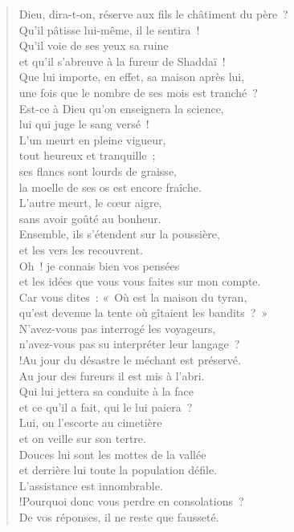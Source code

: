 \documentclass[french,twoside]{book} %
\def\mednobreak{\ifdim\lastskip<\medskipamount
  \removelastskip\nopagebreak\medskip\fi}
\newcommand{\labelblock}[1]{\medbreak{\noindent\color{rubric}\bfseries #1}\par\mednobreak}
\newcommand\chapterclose{} %
\begin{document}
\labelblock{Impunité des criminels}


\begin{verse}
Dieu, dira-t-on, réserve aux fils le châtiment du père ? \\
Qu’il pâtisse lui-même, il le sentira !\\
Qu’il voie de ses yeux sa ruine \\
et qu’il s’abreuve à la fureur de Shaddaï !\\
Que lui importe, en effet, sa maison après lui, \\
une fois que le nombre de ses mois est tranché ?\\
Est-ce à Dieu qu’on enseignera la science, \\
lui qui juge le sang versé !\\
L’un meurt en pleine vigueur, \\
tout heureux et tranquille ;\\
ses flancs sont lourds de graisse, \\
la moelle de ses os est encore fraîche.\\
L’autre meurt, le cœur aigre, \\
sans avoir goûté au bonheur.\\
Ensemble, ils s’étendent sur la poussière, \\
et les vers les recouvrent.\\
Oh ! je connais bien vos pensées \\
et les idées que vous vous faites sur mon compte.\\
Car vous dites : « Où est la maison du tyran, \\
qu’est devenue la tente où gîtaient les bandits ? »\\
N’avez-vous pas interrogé les voyageurs, \\
n’avez-vous pas su interpréter leur langage ?\\!Au jour du désastre le méchant est préservé. \\
Au jour des fureurs il est mis à l’abri.\\
Qui lui jettera sa conduite à la face \\
et ce qu’il a fait, qui le lui paiera ?\\
Lui, on l’escorte au cimetière \\
et on veille sur son tertre.\\
Douces lui sont les mottes de la vallée \\
et derrière lui toute la population défile. \\
L’assistance est innombrable.\\!Pourquoi donc vous perdre en consolations ? \\
De vos réponses, il ne reste que fausseté.\\

\end{verse}
\chapterclose
\end{document}
